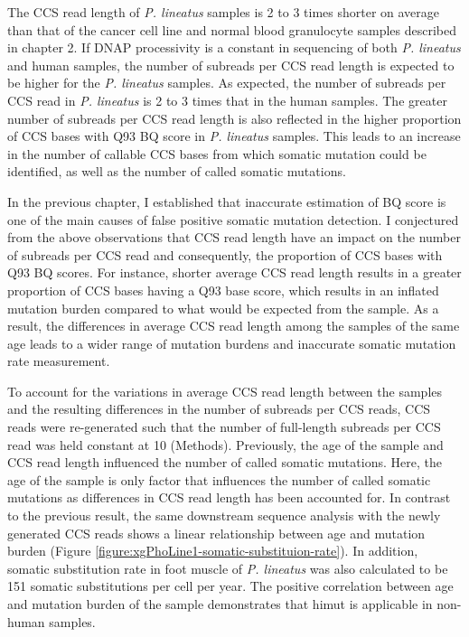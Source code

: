 The CCS read length of \textit{P. lineatus} samples is 2 to 3 times shorter on average than that of the cancer cell line and normal blood granulocyte samples described in chapter 2. If DNAP processivity is a constant in sequencing of both \textit{P. lineatus} and human samples, the number of subreads per CCS read length is expected to be higher for the \textit{P. lineatus} samples. As expected, the number of subreads per CCS read in \textit{P. lineatus} is 2 to 3 times that in the human samples. The greater number of subreads per CCS read length is also reflected in the higher proportion of CCS bases with Q93 BQ score in \textit{P. lineatus} samples. This leads to an increase in the number of callable CCS bases from which somatic mutation could be identified, as well as the number of called somatic mutations.

In the previous chapter, I established that inaccurate estimation of BQ score is one of the main causes of false positive somatic mutation detection. I conjectured from the above observations that CCS read length have an impact on the number of subreads per CCS read and consequently, the proportion of CCS bases with Q93 BQ scores. For instance, shorter average CCS read length results in a greater proportion of CCS bases having a Q93 base score, which results in an inflated mutation burden compared to what would be expected from the sample.  As a result, the differences in average CCS read length among the samples of the same age leads to a wider range of mutation burdens and inaccurate somatic mutation rate measurement.  

To account for the variations in average CCS read length between the samples and the resulting differences in the number of subreads per CCS reads, CCS reads were re-generated such that the number of full-length subreads per CCS read was held constant at 10 (Methods). Previously, the age of the sample and CCS read length influenced the number of called somatic mutations. Here, the age of the sample is only factor that influences the number of called somatic mutations as differences in CCS read length has been accounted for. In contrast to the previous result, the same downstream sequence analysis with the newly generated CCS reads shows a linear relationship between age and mutation burden (Figure \ref{figure:xgPhoLine1-somatic-substituion-rate}). In addition, somatic substitution rate in foot muscle of \textit{P. lineatus} was also calculated to be 151 somatic substitutions per cell per year. The positive correlation between age and mutation burden of the sample demonstrates that himut is applicable in non-human samples.

